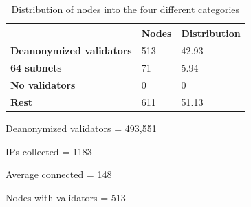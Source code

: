 \begin{table}[]
    \centering
    \caption{Distribution of nodes into the four different categories}
    \begin{tabular}{|l|l|l|}
        \hline
        & \textbf{Nodes} & \textbf{Distribution} \\ \hline
        \textbf{Deanonymized validators} & 513            & 42.93                 \\ \hline
        \textbf{64 subnets}              & 71             & 5.94                  \\ \hline
        \textbf{No validators}           & 0              & 0                     \\ \hline
        \textbf{Rest}                    & 611            & 51.13                 \\ \hline
    \end{tabular}
    \label{tab:distribution}
\end{table}


Deanonymized validators = 493,551

IPs collected = 1183

Average connected = 148

Nodes with validators = 513

